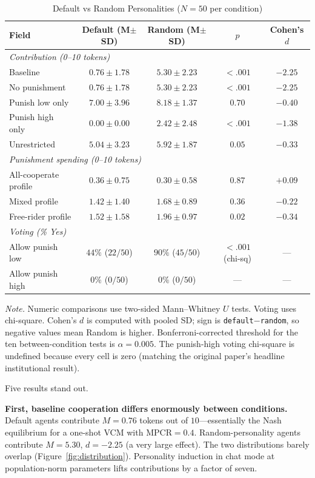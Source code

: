 \documentclass[12pt, a4paper]{article}
\begin{document}
\begin{table}[H]
\centering
\caption{Default vs Random Personalities ($N=50$ per condition)}
\label{tab:results}
\small
\begin{tabular}{lcccc}
\toprule
Field & Default (M$\pm$SD) & Random (M$\pm$SD) & $p$ & Cohen's $d$ \\
\midrule
\multicolumn{5}{l}{\textit{Contribution (0--10 tokens)}} \\
\quad Baseline & $0.76 \pm 1.78$ & $5.30 \pm 2.23$ & $<.001$ & $-2.25$ \\
\quad No punishment & $0.76 \pm 1.78$ & $5.30 \pm 2.23$ & $<.001$ & $-2.25$ \\
\quad Punish low only & $7.00 \pm 3.96$ & $8.18 \pm 1.37$ & $0.70$ & $-0.40$ \\
\quad Punish high only & $0.00 \pm 0.00$ & $2.42 \pm 2.48$ & $<.001$ & $-1.38$ \\
\quad Unrestricted & $5.04 \pm 3.23$ & $5.92 \pm 1.87$ & $0.05$ & $-0.33$ \\
\midrule
\multicolumn{5}{l}{\textit{Punishment spending (0--10 tokens)}} \\
\quad All-cooperate profile & $0.36 \pm 0.75$ & $0.30 \pm 0.58$ & $0.87$ & $+0.09$ \\
\quad Mixed profile & $1.42 \pm 1.40$ & $1.68 \pm 0.89$ & $0.36$ & $-0.22$ \\
\quad Free-rider profile & $1.52 \pm 1.58$ & $1.96 \pm 0.97$ & $0.02$ & $-0.34$ \\
\midrule
\multicolumn{5}{l}{\textit{Voting (\% Yes)}} \\
\quad Allow punish low & $44\%$ ($22/50$) & $90\%$ ($45/50$) & $<.001$ (chi-sq) & --- \\
\quad Allow punish high & $0\%$ ($0/50$) & $0\%$ ($0/50$) & --- & --- \\
\bottomrule
\end{tabular}

\medskip
\footnotesize
\textit{Note.} Numeric comparisons use two-sided Mann--Whitney $U$ tests. Voting uses chi-square. Cohen's $d$ is computed with pooled SD; sign is \texttt{default$-$random}, so negative values mean Random is higher. Bonferroni-corrected threshold for the ten between-condition tests is $\alpha=0.005$. The punish-high voting chi-square is undefined because every cell is zero (matching the original paper's headline institutional result).
\end{table}

Five results stand out.

\textbf{First, baseline cooperation differs enormously between conditions.} Default agents contribute $M=0.76$ tokens out of $10$---essentially the Nash equilibrium for a one-shot VCM with $\mathrm{MPCR}=0.4$. Random-personality agents contribute $M=5.30$, $d=-2.25$ (a very large effect). The two distributions barely overlap (Figure~\ref{fig:distribution}). Personality induction in chat mode at population-norm parameters lifts contributions by a factor of seven.
\end{document}
